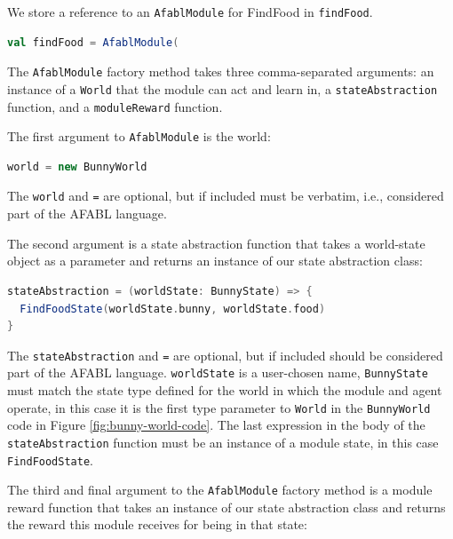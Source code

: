 We store a reference to an {\tt AfablModule} for FindFood in {\tt findFood}.

\begin{center}
\begin{lstlisting}[language=Scala,frame=none]
val findFood = AfablModule(
\end{lstlisting}
\end{center}

The {\tt AfablModule} factory method takes three comma-separated arguments: an instance of a {\tt World} that the module can act and learn in, a {\tt stateAbstraction} function, and a {\tt moduleReward} function.

The first argument to {\tt AfablModule} is the world:

\begin{center}
\begin{lstlisting}[language=Scala,frame=none]
world = new BunnyWorld
\end{lstlisting}
\end{center}

The {\tt world} and {\tt =} are optional, but if included must be verbatim, i.e., considered part of the AFABL language.

The second argument is a state abstraction function that takes a world-state object as a parameter and returns an instance of our state abstraction class:

\begin{center}
\begin{lstlisting}[language=Scala,frame=none]
stateAbstraction = (worldState: BunnyState) => {
  FindFoodState(worldState.bunny, worldState.food)
}
\end{lstlisting}
\end{center}

The {\tt stateAbstraction} and {\tt =} are optional, but if included should be considered part of the AFABL language. {\tt worldState} is a user-chosen name, {\tt BunnyState} must match the state type defined for the world in which the module and agent operate, in this case it is the first type parameter to {\tt World} in the {\tt BunnyWorld} code in Figure \ref{fig:bunny-world-code}. The last expression in the body of the {\tt stateAbstraction} function must be an instance of a module state, in this case {\tt FindFoodState}.

The third and final argument to the {\tt AfablModule} factory method is a module reward function that takes an instance of our state abstraction class and returns the reward this module receives for being in that state:

